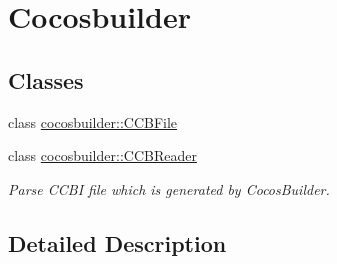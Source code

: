 \hypertarget{group__cocosbuilder}{}\section{Cocosbuilder}
\label{group__cocosbuilder}
\subsection*{Classes}
\begin{DoxyCompactItemize}
\item 
class \hyperlink{classcocosbuilder_1_1CCBFile}{cocosbuilder\+::\+C\+C\+B\+File}
\item 
class \hyperlink{classcocosbuilder_1_1CCBReader}{cocosbuilder\+::\+C\+C\+B\+Reader}
\begin{DoxyCompactList}\small\item\em Parse C\+C\+BI file which is generated by Cocos\+Builder. \end{DoxyCompactList}\end{DoxyCompactItemize}


\subsection{Detailed Description}
